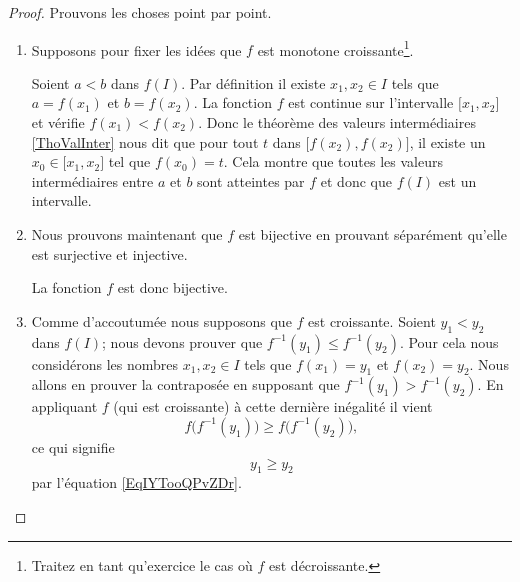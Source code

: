 \begin{proof}

    Prouvons les choses point par point. 

    \begin{enumerate}
    \item

        Supposons pour fixer les idées que \( f\) est monotone croissante\footnote{Traitez en tant qu'exercice le cas où \( f\) est décroissante.}.
        
        Soient \( a< b\) dans \( f(I)\). Par définition il existe \( x_1,x_2\in I\) tels que \( a=f(x_1)\) et \( b=f(x_2)\). La fonction \( f\) est continue sur l'intervalle \( \mathopen[ x_1 , x_2 \mathclose]\) et vérifie \( f(x_1)<f(x_2)\). Donc le théorème des valeurs intermédiaires \ref{ThoValInter} nous dit que pour tout \( t\) dans \( \mathopen[ f(x_2) , f(x_2) \mathclose]\), il existe un \( x_0\in\mathopen[ x_1 , x_2 \mathclose]\) tel que \( f(x_0)=t\). Cela montre que toutes les valeurs intermédiaires entre \( a\) et \( b\) sont atteintes par \( f\) et donc que \( f(I)\) est un intervalle.

    \item

    Nous prouvons maintenant que \( f\) est bijective en prouvant séparément qu'elle est surjective et injective.

    La fonction \( f\) est donc bijective.

\item

    Comme d'accoutumée nous supposons que \( f\) est croissante. Soient \( y_1<y_2\) dans \( f(I)\); nous devons prouver que \( f^{-1}(y_1)\leq f^{-1}(y_2)\). Pour cela nous considérons les nombres \( x_1,x_2\in I\) tels que \( f(x_1)=y_1\) et \( f(x_2)=y_2\). Nous allons en prouver la contraposée en supposant que \( f^{-1}(y_1)>f^{-1}(y_2)\). En appliquant \( f\) (qui est croissante) à cette dernière inégalité il vient
    \begin{equation}
        f\big( f^{-1}(y_1) \big)\geq f\big( f^{-1}(y_2) \big),
    \end{equation}
    ce qui signifie
    \begin{equation}
        y_1\geq y_2
    \end{equation}
    par l'équation \eqref{EqIYTooQPvZDr}.


\end{enumerate}
\end{proof}
